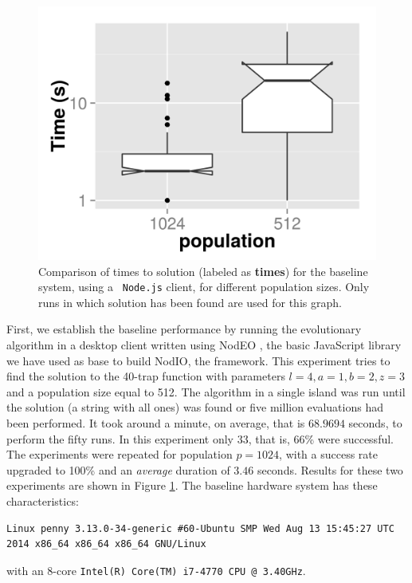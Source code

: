 \documentclass[journal,onecolumn]{IEEEtran}
\begin{document}
\begin{figure}[!t]
\centering
\includegraphics[width=12cm]{baseline-times.png}
\caption{Comparison of times to solution (labeled as {\bf times}) for the baseline system, using a {\tt
    Node.js} client, for different population sizes. Only
runs in which solution has been found are used for this graph.}
\label{fig:baseline}
\end{figure}
First, we establish the baseline performance by running the
evolutionary algorithm in a desktop client written using NodEO
\cite{nodeo2014}, the basic JavaScript library we have used as base to
build {\sf NodIO}, the framework. This experiment tries to 
find the solution to the 40-trap function with parameters $l=4, a=1,
b=2, z=3$ and a population size equal to 512. The algorithm in a
single island was run until the solution (a string with all
ones) was found or five million evaluations had been performed. It
took around a minute, on average, that is $68.9694$ seconds, to
perform the fifty runs. In this experiment only 33, that is, 66\% were
successful. The experiments were repeated for population $p=1024$,
with a success rate upgraded to 100\% and an {\em average} duration of $3.46$
seconds. Results for these two experiments
are shown in Figure \ref{fig:baseline}. The baseline hardware system has these
characteristics: 
\begin{verbatim}
Linux penny 3.13.0-34-generic #60-Ubuntu SMP Wed Aug 13 15:45:27 UTC
2014 x86_64 x86_64 x86_64 GNU/Linux
\end{verbatim}
with an 8-core {\tt Intel(R) Core(TM) i7-4770 CPU @ 3.40GHz}.
\end{document}
